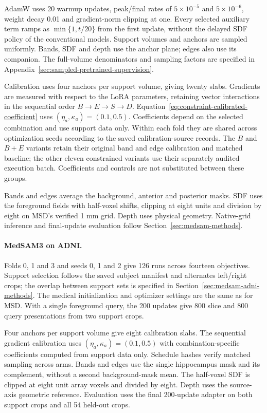 \documentclass[12pt,a4paper]{article}
\begin{document}
AdamW uses 20 warmup updates, peak/final rates of $5\times10^{-5}$
and $5\times10^{-6}$, weight decay 0.01 and gradient-norm clipping
at one. Every selected auxiliary term ramps as $\min\{1,t/20\}$
from the first update, without the delayed SDF policy of the conventional
models. Support volumes and anchors are sampled uniformly. Bands,
SDF and depth use the anchor plane; edges also use its companion.
The full-volume denominators and sampling factors are specified in
Appendix~\ref{sec:sampled-pretrained-supervision}.

Calibration uses four anchors per support volume, giving twenty
slabs. Gradients are measured with respect to the LoRA parameters,
retaining vector interactions in the sequential order
$B\to E\to S\to D$. Equation~\ref{eq:constraint-calibrated-coefficient}
uses $(\eta_a,\kappa_a)=(0.1,0.5)$. Coefficients depend on the selected
combination and use support data only. Within each fold they are shared
across optimization seeds according to the saved calibration-source
records. The $B$ and $B+E$ variants retain their original band and edge
calibration and matched baseline; the other eleven constrained variants
use their separately audited execution batch. Coefficients and controls
are not substituted between these groups.

Bands and edges average the background, anterior and posterior masks.
SDF uses the foreground fields with half-voxel shifts, clipping at eight
units and division by eight on MSD's verified 1 mm grid. Depth uses
physical geometry. Native-grid inference and final-update evaluation
follow Section~\ref{sec:medsam-methods}.

\paragraph{MedSAM3 on ADNI.}\label{sec:medsam-adni-methods-details}
Folds 0, 1 and 3 and seeds 0, 1 and 2 give 126 runs across fourteen
objectives. Support selection follows the saved subject manifest and
alternates left/right crops; the overlap between support sets is
specified in Section~\ref{sec:medsam-adni-methods}. The medical
initialization and optimizer settings are the same as for MSD.
With a single foreground query, the 200 updates give 800 slice and
800 query presentations from two support crops.

Four anchors per support volume give eight calibration slabs.
The sequential gradient calibration uses
$(\eta_a,\kappa_a)=(0.1,0.5)$ with combination-specific coefficients
computed from support data only. Schedule hashes verify matched
sampling across arms. Bands and edges use the single hippocampus
mask and its complement, without a second background-mask mean.
The half-voxel SDF is clipped at eight unit array voxels and divided
by eight. Depth uses the source-axis geometric reference.
Evaluation uses the final 200-update adapter on both support crops
and all 54 held-out crops.
\end{document}
